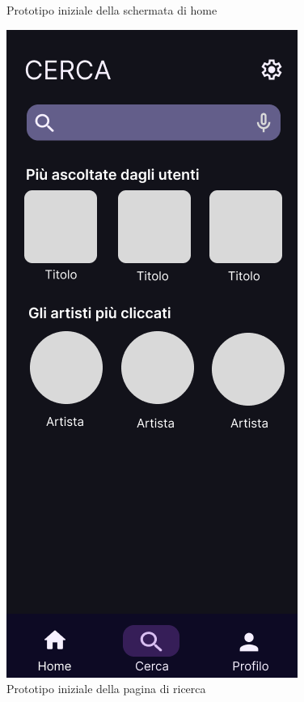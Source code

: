 \documentclass{article}
\begin{document}
\begin{center}
\begin{figure}[htbp]
\begin{minipage}[t]{0.2\textwidth}
					\caption{Prototipo iniziale della schermata di home}
					\label{fig:home_page}
				\end{minipage}%
				\hspace{0.1\textwidth}
				\begin{minipage}[t]{0.2\textwidth}
					\centering
					\includegraphics[width=\textwidth]{search_page}
					\caption{Prototipo iniziale della pagina di ricerca}
					\label{fig:search_page}
				\end{minipage}
			\end{figure}
		\end{center}
		\newpage
		
\end{document}

